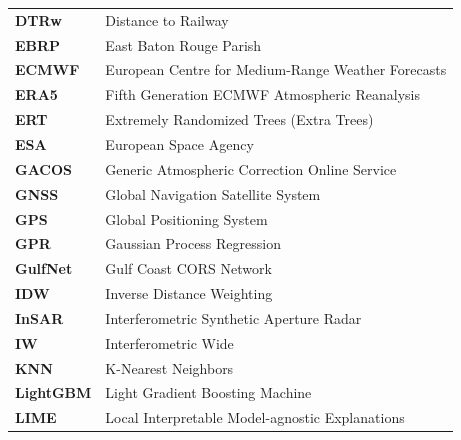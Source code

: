 \documentclass[oneside,doublespacing,flushright]{lsuthesis}
\begin{document}
\newpage
\noindent
\begin{tabular}{@{}l@{\hspace{4em}}l@{}}
\textbf{DTRw} & Distance to Railway \\
\textbf{EBRP} & East Baton Rouge Parish \\
\textbf{ECMWF} & European Centre for Medium-Range Weather Forecasts \\
\textbf{ERA5} & Fifth Generation ECMWF Atmospheric Reanalysis \\
\textbf{ERT} & Extremely Randomized Trees (Extra Trees) \\
\textbf{ESA} & European Space Agency \\
\textbf{GACOS} & Generic Atmospheric Correction Online Service \\
\textbf{GNSS} & Global Navigation Satellite System \\
\textbf{GPS} & Global Positioning System \\
\textbf{GPR} & Gaussian Process Regression \\
\textbf{GulfNet} & Gulf Coast CORS Network \\
\textbf{IDW} & Inverse Distance Weighting \\
\textbf{InSAR} & Interferometric Synthetic Aperture Radar \\
\textbf{IW} & Interferometric Wide \\
\textbf{KNN} & K-Nearest Neighbors \\
\textbf{LightGBM} & Light Gradient Boosting Machine \\
\textbf{LIME} & Local Interpretable Model-agnostic Explanations \\
\end{tabular}
\end{document}
